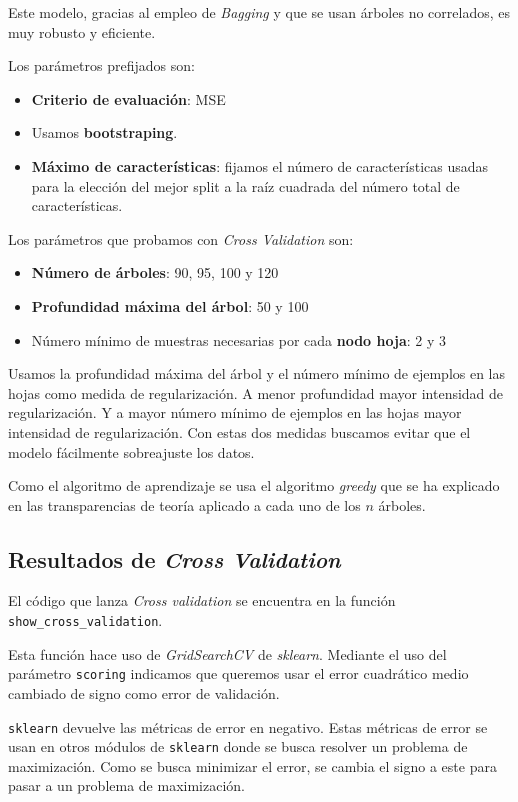 \documentclass[11pt]{article}
\begin{document}
Este modelo, gracias al empleo de \emph{Bagging} y que se usan árboles no correlados, es muy robusto y eficiente.

Los parámetros prefijados son:

\begin{itemize}
  \item \textbf{Criterio de evaluación}: MSE
  \item Usamos \textbf{bootstraping}.
  \item \textbf{Máximo de características}: fijamos el número de características usadas para la elección del mejor split a la raíz cuadrada del número total de características.
\end{itemize}

Los parámetros que probamos con \emph{Cross Validation} son:

\begin{itemize}
  \item \textbf{Número de árboles}: 90, 95, 100 y 120
  \item \textbf{Profundidad máxima del árbol}: 50 y 100
  \item Número mínimo de muestras necesarias por cada \textbf{nodo hoja}: 2 y 3
\end{itemize}

Usamos la profundidad máxima del árbol y el número mínimo de ejemplos en las hojas como medida de regularización. A menor profundidad mayor intensidad de regularización. Y a mayor número mínimo de ejemplos en las hojas mayor intensidad de regularización. Con estas dos medidas buscamos evitar que el modelo fácilmente sobreajuste los datos.

Como el algoritmo de aprendizaje se usa el algoritmo \emph{greedy} que se ha explicado en las transparencias de teoría aplicado a cada uno de los $n$ árboles.

\subsection{Resultados de \emph{Cross Validation}} \label{cross_validation}

El código que lanza \emph{Cross validation} se encuentra en la función \lstinline{show_cross_validation}.

Esta función hace uso de \emph{GridSearchCV} de \emph{sklearn}. Mediante el uso del parámetro \lstinline{scoring} indicamos que queremos usar el error cuadrático medio cambiado de signo como error de validación.

\lstinline{sklearn} devuelve las métricas de error en negativo. Estas métricas de error se usan en otros módulos de \lstinline{sklearn} donde se busca resolver un problema de maximización. Como se busca minimizar el error, se cambia el signo a este para pasar a un problema de maximización.
\end{document}
